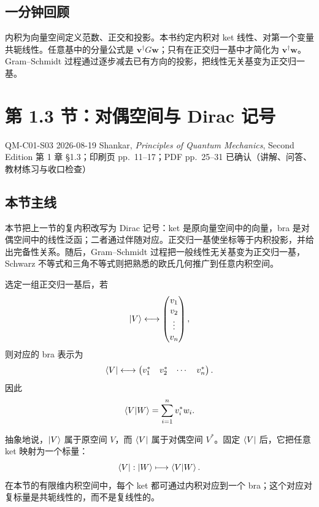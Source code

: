\subsection{一分钟回顾}

内积为向量空间定义范数、正交和投影。本书约定内积对 ket 线性、对第一个变量共轭线性。任意基中的分量公式是 $\bm v^\dagger G\bm w$；只有在正交归一基中才简化为 $\bm v^\dagger\bm w$。Gram--Schmidt 过程通过逐步减去已有方向的投影，把线性无关基变为正交归一基。

\section{第 1.3 节：对偶空间与 Dirac 记号}
\label{section:QM-C01-S03}

\studymeta
  {QM-C01-S03}
  {2026-08-19}
  {Shankar, \textit{Principles of Quantum Mechanics}, Second Edition}
  {第 1 章 \S 1.3；印刷页 pp.~11--17；PDF pp.~25--31}
  {已确认（讲解、问答、教材练习与收口检查）}

\subsection{本节主线}

本节把上一节的复内积改写为 Dirac 记号：ket 是原向量空间中的向量，bra 是对偶空间中的线性泛函；二者通过伴随对应。正交归一基使坐标等于内积投影，并给出完备性关系。随后，Gram--Schmidt 过程把一般线性无关基变为正交归一基，Schwarz 不等式和三角不等式则把熟悉的欧氏几何推广到任意内积空间。



选定一组正交归一基后，若
\[
  \left|V\right\rangle\longleftrightarrow
  \begin{pmatrix}v_1\\v_2\\\vdots\\v_n\end{pmatrix},
\]
则对应的 bra 表示为
\[
  \left\langle V\right|\longleftrightarrow
  \begin{pmatrix}v_1^*&v_2^*&\cdots&v_n^*\end{pmatrix}.
\]
因此
\begin{equation}
  \left\langle V \middle| W \right\rangle=\sum_{i=1}^{n}v_i^*w_i.
  \label{eq:QM-C01-S03-inner-product-components}
\end{equation}

抽象地说，$\left|V\right\rangle$ 属于原空间 $V$，而 $\left\langle V\right|$ 属于对偶空间 $V^*$。固定 $\left\langle V\right|$ 后，它把任意 ket 映射为一个标量：
\[
  \left\langle V\right|:\left|W\right\rangle\longmapsto\left\langle V \middle| W \right\rangle.
\]
在本节的有限维内积空间中，每个 ket 都可通过内积对应到一个 bra；这个对应对复标量是共轭线性的，而不是复线性的。

